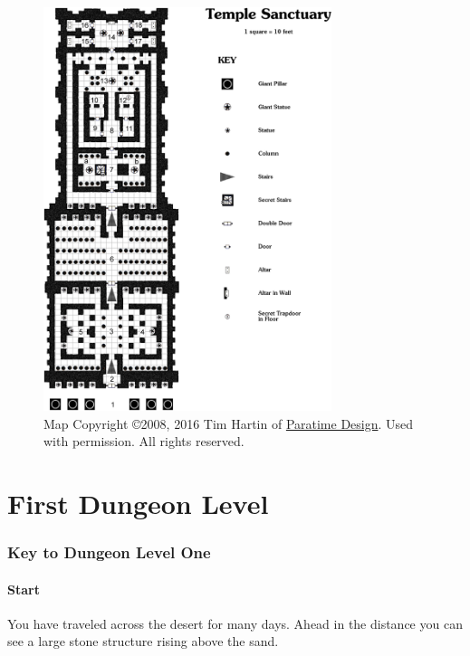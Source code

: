 \documentclass[a4paper,serif]{module}
\begin{document}
\begin{figure}[p]
\centering
\includegraphics[width=0.75\textwidth]{module_map.png}
\vspace{5ex}
\caption*{Map Copyright \copyright 2008, 2016 Tim Hartin of
\href{http://paratime.ca}{Paratime Design}. Used with permission. All rights reserved.}
\label{img:map}
\end{figure}

\part{First Dungeon Level}
\label{example_dungeon}

\section*{Key to Dungeon Level One}

\subsection*{Start}

\begin{boxtext}
You have traveled across the desert for many days. Ahead in the distance you can see a large stone
structure rising above the sand.
\end{boxtext}
\end{document}
